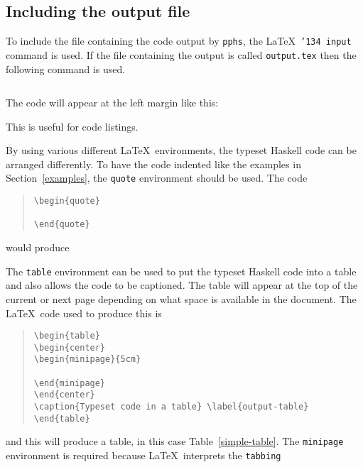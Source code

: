 \subsection{Including the output file}

To include the file containing the code output by {\tt pphs}, the \LaTeX\
{\tt \char'134 input} command is used.  If the file containing the output is called
{\tt output.tex} then the following command is used.
\begin{quote}
\begin{verbatim}

\end{verbatim}
\end{quote}
The code will appear at the left margin like this:

This is useful for code listings.

By using various different \LaTeX\ environments, the typeset Haskell code
can be arranged differently.
To have the code indented like the examples in Section~\ref{examples}, the
{\tt quote} environment should be used.  The code
\begin{quote}
\begin{verbatim}
\begin{quote}

\end{quote}
\end{verbatim}
\end{quote}
would produce
\begin{quote}

\end{quote}
The {\tt table} environment can be used to put the typeset Haskell code
into a table and also allows the code to be captioned.
The table will appear at the top of the current or next page depending on what
space is available in the document.  The \LaTeX\ code used to produce this is
\begin{quote}
\begin{verbatim}
\begin{table}
\begin{center}
\begin{minipage}{5cm}

\end{minipage}
\end{center}
\caption{Typeset code in a table} \label{output-table}
\end{table}
\end{verbatim}
\end{quote}
and this will produce a table, in this case Table~\ref{simple-table}.
The {\tt minipage} environment is required because \LaTeX\ interprets the {\tt tabbing}
